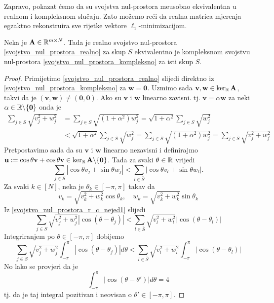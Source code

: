 \documentclass[a4paper,twoside,12pt]{memoir} %
\newcommand{\vect}[1]{\mathbf{#1}}
\renewcommand{\vec}{\vect}
\begin{document}
\noindent
Zapravo, pokazat \'cemo da su svojstva nul-prostora me\dj usobno ekvivalentna u realnom i kompleksnom slu\v{c}aju. Zato mo\v{z}emo re\'ci da realna matrica mjerenja egzaktno rekonstruira sve rijetke vektore $\ell_1$-minimizacijom. 
\begin{thm}
    Neka je $\vec A \in \R^{m \times N}$. Tada je realno svojstvo nul-prostora \eqref{svojstvo_nul_prostora_realno} za skup $S$ ekvivalentno je kompleksnom svojstvu nul-prostora \eqref{svojstvo_nul_prostora_kompleksno} za isti skup $S$.
\end{thm}
\begin{proof}
    Primijetimo \eqref{svojstvo_nul_prostora_realno} slijedi direktno iz \eqref{svojstvo_nul_prostora_kompleksno} za $\vec w = \vec 0$. Uzmimo sada $\vec v, \vec w \in \ker_{\R}\vec A$, takvi da je $(\vec v, \vec w) \neq (\vec 0, \vec 0)$. Ako su $\vec v$ i $\vec w$ linearno zavisni. tj. $\vec v = \alpha \vec w$ za neki $\alpha \in \R \backslash \{ \vec 0 \}$ onda je 
   \begin{align*}
       \sum_{j \in S} \sqrt{v_j^2+w_j^2} &=  \sum_{j \in S} \sqrt{(1+\alpha^2)w_j^2}=\sqrt{1+\alpha^2}\sum_{j \in S} \sqrt{w_j^2}\\
       &< \sqrt{1+\alpha^2}\sum_{j \in \bar S} \sqrt{w_j^2} = \sum_{j \in \bar S} \sqrt{(1+\alpha^2)w_j^2} = \sum_{j \in \bar S} \sqrt{v_j^2+w_j^2}
   \end{align*} 
   Pretpostavimo sada da su $\vec v$ i $\vec w$ linearno nezavisni i definirajmo $\vec u := \cos \theta \vec v + \cos \theta \vec v \in \ker_{\R} \vec A \backslash \{\vec 0\}$. Tada za svaki $\theta \in \mathbb{R}$ vrijedi
   \begin{equation}\label{svojstvo_nul_prostora_r_c_nejed1}
       \sum_{j \in S} |\cos \theta v_j + \sin \theta w_j| < \sum_{l \in \bar S} |\cos \theta v_l + \sin \theta w_l|.
   \end{equation}
   Za svaki $k \in [N]$, neka je $\theta_k \in [-\pi, \pi]$ takav da
   \begin{equation*}
       v_k = \sqrt{v_k^2 + w_k^2}\cos{\theta_k}, \quad w_k = \sqrt{v_k^2 + w_k^2}\sin{\theta_k}
   \end{equation*}
   Iz \eqref{svojstvo_nul_prostora_r_c_nejed1} slijedi
   \begin{equation*}
       \sum_{j \in S}\sqrt{v_j^2+w_j^2}|\cos(\theta - \theta_j)|<\sum_{l \in \bar S}\sqrt{v_l^2+w_l^2}|\cos(\theta - \theta_l)|
   \end{equation*}
   Integriranjem po $\theta \in [-\pi,\pi]$ dobijemo
   \begin{equation*}
       \sum_{j \in S}\sqrt{v_j^2+w_j^2}\int_{-\pi}^{\pi}  |\cos(\theta - \theta_j)| d \theta<\sum_{l \in \bar S}\sqrt{v_l^2+w_l^2}\int_{-\pi}^{\pi}  |\cos(\theta - \theta_l)|
   \end{equation*}
    No lako se provjeri da je
    \begin{equation*}
         \int_{-\pi}^{\pi}  |\cos(\theta - \theta')| d \theta = 4
    \end{equation*}
    tj. da je taj integral pozitivan i neovisan o $\theta' \in [-\pi, \pi]$.
\end{proof}
\end{document}
